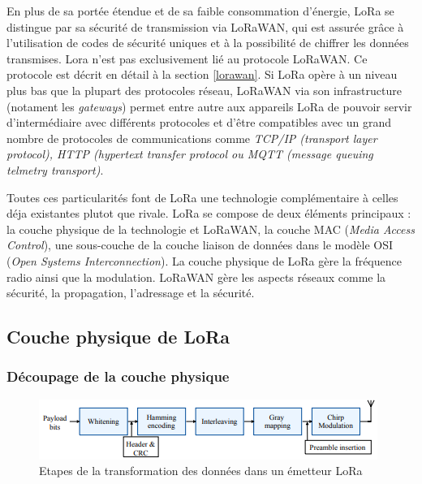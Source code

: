 En plus de sa portée étendue et de sa faible consommation d'énergie, LoRa se distingue par sa sécurité de transmission via LoRaWAN, qui est assurée grâce à l'utilisation de codes de sécurité uniques et à la possibilité de chiffrer les données transmises. Lora n'est pas exclusivement lié au protocole LoRaWAN. Ce protocole est décrit en détail à la section \ref{lorawan}. Si LoRa opère à un niveau plus bas que la plupart des protocoles réseau, LoRaWAN via son infrastructure (notament les \textit{gateways}) permet entre autre aux appareils LoRa de pouvoir servir d'intermédiaire avec différents protocoles et d'être compatibles avec un grand nombre de protocoles de communications comme \textit{TCP/IP (transport layer protocol), HTTP (hypertext transfer protocol ou MQTT (message queuing telmetry transport)}.

\vspace{0.1cm}

Toutes ces  particularités font de LoRa une technologie complémentaire à celles déja existantes plutot que rivale.
LoRa se compose de deux éléments principaux : la couche physique de la technologie et LoRaWAN, la couche MAC (\textit{Media Access Control}), une sous-couche de la couche liaison de données dans le modèle OSI (\textit{Open Systems Interconnection}). La couche physique de LoRa gère la fréquence radio ainsi que la modulation. LoRaWAN gère les aspects réseaux comme la sécurité, la propagation, l'adressage et la sécurité.

\subsection{Couche physique de LoRa}

\subsubsection{Découpage de la couche physique}

\begin{figure}[h]
\centering

\includegraphics[scale=1]{images/physical_lora_rx.PNG}
\caption{Etapes de la transformation des données dans un émetteur LoRa \cite{loraphy}}\label{term4}
\end{figure}



